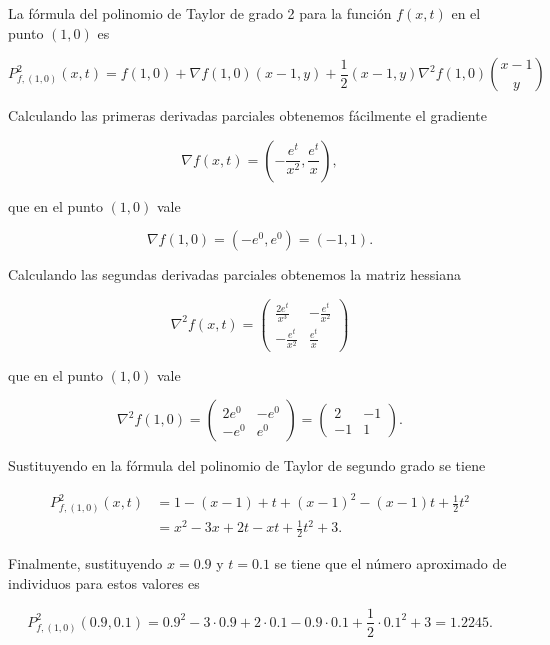 \documentclass[
  a4paper,
]{scrreport}
\theoremstyle{definition}
\theoremstyle{remark}
\begin{document}
\begin{tcolorbox}[enhanced jigsaw, left=2mm, coltitle=black, colbacktitle=quarto-callout-tip-color!10!white, opacitybacktitle=0.6, colback=white, breakable, titlerule=0mm, toptitle=1mm, rightrule=.15mm, bottomtitle=1mm, bottomrule=.15mm, toprule=.15mm, leftrule=.75mm, arc=.35mm, opacityback=0, title=\textcolor{quarto-callout-tip-color}{\faLightbulb}\hspace{0.5em}{Solución}, colframe=quarto-callout-tip-color-frame]

La fórmula del polinomio de Taylor de grado 2 para la función \(f(x,t)\)
en el punto \((1,0)\) es

\[
P^2_{f,(1,0)}(x,t) = f(1,0) + \nabla f(1,0)(x-1, y) + \frac{1}{2} (x-1, y)\nabla^2 f(1,0)\binom{x-1}{y}
\]

Calculando las primeras derivadas parciales obtenemos fácilmente el
gradiente

\[
\nabla f(x,t) = \left(-\frac{e^t}{x^2}, \frac{e^t}{x}\right),
\]

que en el punto \((1,0)\) vale

\[
\nabla f(1,0) = (-e^0, e^0) = (-1, 1).
\]

Calculando las segundas derivadas parciales obtenemos la matriz hessiana

\[
\nabla^2 f(x,t)
= \begin{pmatrix}
\frac{2e^t}{x^3} & -\frac{e^t}{x^2} \\
-\frac{e^t}{x^2} & \frac{e^t}{x}
\end{pmatrix}
\]

que en el punto \((1,0)\) vale

\[
\nabla^2 f(1,0) 
= \begin{pmatrix}
2e^0 & -e^0 \\
-e^0 & e^0
\end{pmatrix} 
= \begin{pmatrix}
2 & -1 \\
-1 & 1
\end{pmatrix}.
\]

Sustituyendo en la fórmula del polinomio de Taylor de segundo grado se
tiene

\begin{align*}
P^2_{f,(1,0)}(x,t) 
&= 1 - (x-1) + t + (x-1)^2 - (x-1)t + \frac{1}{2}t^2 \\
&= x^2 -3x + 2t -xt + \frac{1}{2}t^2 + 3.
\end{align*}

Finalmente, sustituyendo \(x=0.9\) y \(t=0.1\) se tiene que el número
aproximado de individuos para estos valores es

\[
P^2_{f,(1,0)}(0.9,0.1) = 0.9^2 -3\cdot 0.9 + 2\cdot 0.1 -0.9\cdot 0.1 + \frac{1}{2}\cdot 0.1^2 + 3 = 1.2245.
\]

\end{tcolorbox}
\end{document}
